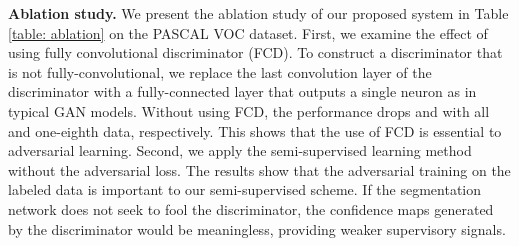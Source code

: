 \documentclass{bmvc2k}
\begin{document}
	\vspace{-3mm}		
	{\flushleft \bf Ablation study.}
	We present the ablation study of our proposed system in Table \ref{table: ablation} on the PASCAL VOC dataset.
First, we examine the effect of using fully convolutional discriminator (FCD).
To construct a discriminator that is not fully-convolutional, we replace the last convolution layer of the discriminator with a fully-connected layer that outputs a single neuron as in typical GAN models.
Without using FCD, the performance drops  and  with all and one-eighth data, respectively.
This shows that the use of FCD is essential to adversarial learning.
Second, we apply the semi-supervised learning method without the adversarial loss.
The results show that the adversarial training on the labeled data is important to our semi-supervised scheme.
If the segmentation network does not seek to fool the discriminator, the confidence maps generated by the discriminator would be meaningless, providing weaker supervisory signals.
	\vspace{-2mm}	
	
\end{document}
